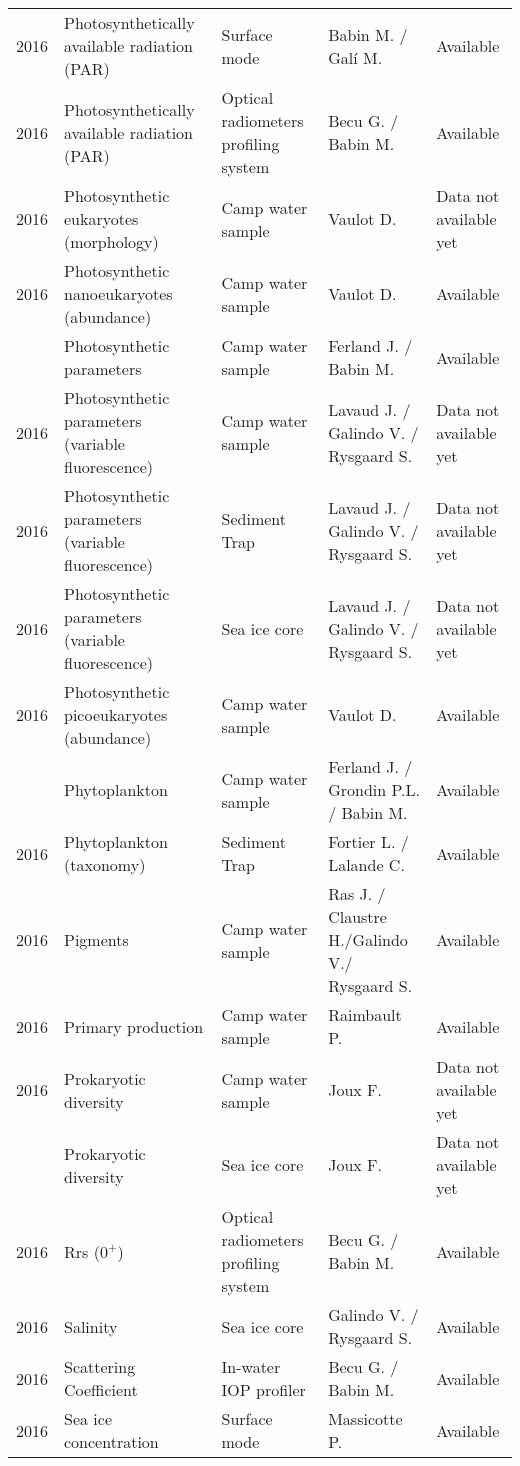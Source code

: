 \documentclass[]{article}
\begin{document}
\begin{landscape}
\begin{longtable}[t]{rllll}
2016 & Photosynthetically available radiation (PAR) & Surface mode & Babin M. / Galí M. & Available\\
2016 & Photosynthetically available radiation (PAR) & Optical radiometers profiling system & Becu G. / Babin M. & Available\\
2016 & Photosynthetic eukaryotes (morphology) & Camp water sample & Vaulot D. & Data not available yet\\
2016 & Photosynthetic nanoeukaryotes (abundance) & Camp water sample & Vaulot D. & Available\\
\addlinespace
2016 & Photosynthetic parameters & Camp water sample & Ferland J. / Babin M. & Available\\
2016 & Photosynthetic parameters (variable fluorescence) & Camp water sample & Lavaud J. / Galindo V. / Rysgaard S. & Data not available yet\\
2016 & Photosynthetic parameters (variable fluorescence) & Sediment Trap & Lavaud J. / Galindo V. / Rysgaard S. & Data not available yet\\
2016 & Photosynthetic parameters (variable fluorescence) & Sea ice core & Lavaud J. / Galindo V. / Rysgaard S. & Data not available yet\\
2016 & Photosynthetic picoeukaryotes (abundance) & Camp water sample & Vaulot D. & Available\\
\addlinespace
2016 & Phytoplankton & Camp water sample & Ferland J. / Grondin P.L. / Babin M. & Available\\
2016 & Phytoplankton (taxonomy) & Sediment Trap & Fortier L. / Lalande C. & Available\\
2016 & Pigments & Camp water sample & Ras J. / Claustre H./Galindo V./ Rysgaard S. & Available\\
2016 & Primary production & Camp water sample & Raimbault P. & Available\\
2016 & Prokaryotic diversity & Camp water sample & Joux F. & Data not available yet\\
\addlinespace
2016 & Prokaryotic diversity & Sea ice core & Joux F. & Data not available yet\\
2016 & Rrs ($0^+$) & Optical radiometers profiling system & Becu G. / Babin M. & Available\\
2016 & Salinity & Sea ice core & Galindo V. / Rysgaard S. & Available\\
2016 & Scattering Coefficient & In-water IOP profiler & Becu G. / Babin M. & Available\\
2016 & Sea ice concentration & Surface mode & Massicotte P. & Available\\

\end{longtable}
\end{landscape}
\end{document}

